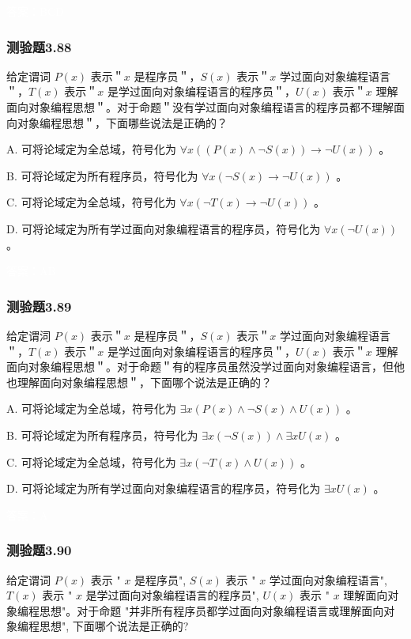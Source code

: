 \documentclass[UTF8, heading=true]{ctexart}
\begin{document}
\textcolor{white}{答案：BCD}

\subsubsection{测验题3.88}

给定谓词 $P(x)$ 表示＂$x$ 是程序员＂，$S(x)$ 表示＂$x$ 学过面向对象编程语言＂，$T(x)$ 表示＂$x$ 是学过面向对象编程语言的程序员＂，$U(x)$ 表示＂$x$ 理解面向对象编程思想＂。对于命题＂没有学过面向对象编程语言的程序员都不理解面向对象编程思想＂，下面哪些说法是正确的？

A. 
可将论域定为全总域，符号化为 $\forall x((P(x) \wedge \neg S(x)) \rightarrow \neg U(x))$ 。

B. 
可将论域定为所有程序员，符号化为 $\forall x(\neg S(x) \rightarrow \neg U(x))$ 。

C. 
可将论域定为全总域，符号化为 $\forall x(\neg T(x) \rightarrow \neg U(x))$ 。

D.  
可将论域定为所有学过面向对象编程语言的程序员，符号化为 $\forall x(\neg U(x))$ 。

\textcolor{white}{答案：AB}

\subsubsection{测验题3.89}

给定谓泀 $P(x)$ 表示＂$x$ 是程序员＂，$S(x)$ 表示＂$x$ 学过面向对象编程语言＂，$T(x)$ 表示＂$x$ 是学过面向对象编程语言的程序员＂，$U(x)$ 表示＂$x$ 理解面向对象编程思想＂。对于命题＂有的程序员虽然没学过面向对象编程语言，但他也理解面向对象编程思想＂，下面哪个说法是正确的？

A. 可将论域定为全总域，符号化为 $\exists x(P(x) \wedge \neg S(x) \wedge U(x))$ 。

B. 可将论域定为所有程序员，符号化为 $\exists x(\neg S(x)) \wedge \exists x U(x)$ 。

C. 可将论域定为全总域，符号化为 $\exists x(\neg T(x) \wedge U(x))$ 。

D.  可将论域定为所有学过面向对象编程语言的程序员，符号化为 $\exists x U(x)$ 。


\textcolor{white}{答案：A}

\subsubsection{测验题3.90}

给定谓词 $P(x)$ 表示 " $x$ 是程序员", $S(x)$ 表示 " $x$ 学过面向对象编程语言", $T(x)$ 表示 " $x$ 是学过面向对象编程语言的程序员", $U(x)$ 表示 " $x$ 理解面向对象编程思想"。对于命题 "并非所有程序员都学过面向对象编程语言或理解面向对象编程思想", 下面哪个说法是正确的?
\end{document}

